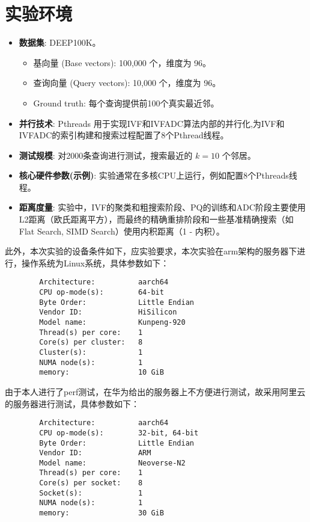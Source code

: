 \documentclass[a4paper]{article}
\begin{document}
	\section{实验环境} %
	\begin{itemize}
		\item \textbf{数据集}: DEEP100K。
		\begin{itemize}
			\item 基向量 (Base vectors): 100,000 个，维度为 96。
			\item 查询向量 (Query vectors): 10,000 个，维度为 96。
			\item Ground truth: 每个查询提供前100个真实最近邻。
		\end{itemize}
		\item \textbf{并行技术}: Pthreads 用于实现IVF和IVFADC算法内部的并行化,为IVF和IVFADC的索引构建和搜索过程配置了8个Pthread线程。
		\item \textbf{测试规模}: 对2000条查询进行测试，搜索最近的 $k=10$ 个邻居。
		\item \textbf{核心硬件参数(示例)}: 实验通常在多核CPU上运行，例如配置8个Pthreads线程。
		\item \textbf{距离度量}: 实验中，IVF的聚类和粗搜索阶段、PQ的训练和ADC阶段主要使用L2距离（欧氏距离平方），而最终的精确重排阶段和一些基准精确搜索（如Flat Search, SIMD Search）使用内积距离（1 - 内积）。
	\end{itemize}
	
	此外，本次实验的设备条件如下，应实验要求，本次实验在arm架构的服务器下进行，操作系统为Linux系统，具体参数如下：
	\begin{verbatim}
		Architecture:          aarch64
		CPU op-mode(s):        64-bit
		Byte Order:            Little Endian
		Vendor ID:             HiSilicon
		Model name:            Kunpeng-920
		Thread(s) per core:    1
		Core(s) per cluster:   8
		Cluster(s):            1
		NUMA node(s):          1
		memory:                10 GiB
	\end{verbatim}
	
	由于本人进行了perf测试，在华为给出的服务器上不方便进行测试，故采用阿里云的服务器进行测试，具体参数如下：
	\begin{verbatim}
		Architecture:          aarch64  
		CPU op-mode(s):        32-bit, 64-bit  
		Byte Order:            Little Endian  
		Vendor ID:             ARM  
		Model name:            Neoverse-N2  
		Thread(s) per core:    1  
		Core(s) per socket:    8  
		Socket(s):             1  
		NUMA node(s):          1  
		memory:                30 GiB  
		
	\end{verbatim}
\end{document}
